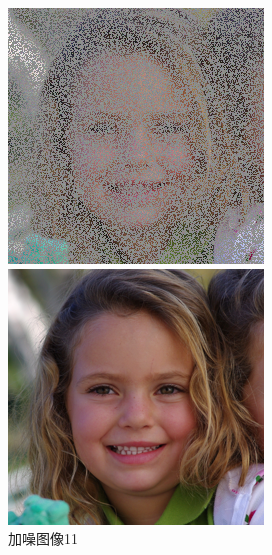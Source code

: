 \begin{figure}[H]
  \centering
  \begin{minipage}[b]{0.3\linewidth}
\includegraphics[width=\linewidth]{Picture/input/00006.png}
    \caption{加噪图像11}
    \label{noised image }
  \end{minipage}
  \hspace{0.1cm} %
   \begin{minipage}[b]{0.3\linewidth}
    \includegraphics[width=\linewidth]{Picture/label/00006.png}

\end{minipage}
\end{figure}
